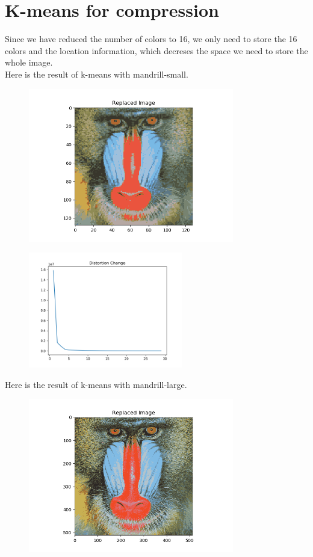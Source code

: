 \documentclass[12pt]{article}
\begin{document}
    \section*{K-means for compression}
    Since we have reduced the number of colors to 16, we only need to store the 16 colors and the location information, 
    which decreses the space we need to store the whole image. \\
    Here is the result of k-means with mandrill-small.
    \begin{figure}[H]
        \centering
        \includegraphics[width=0.80\textwidth]{Q5/replaced_small.png}
    \end{figure}
    \begin{figure}[H]
        \centering
        \includegraphics[width=0.60\textwidth]{Q5/distortion_small.png}
    \end{figure}
    \newpage
    Here is the result of k-means with mandrill-large.
    \begin{figure}[H]
        \centering
        \includegraphics[width=0.80\textwidth]{Q5/replaced_large.png}
    \end{figure}
\end{document}
